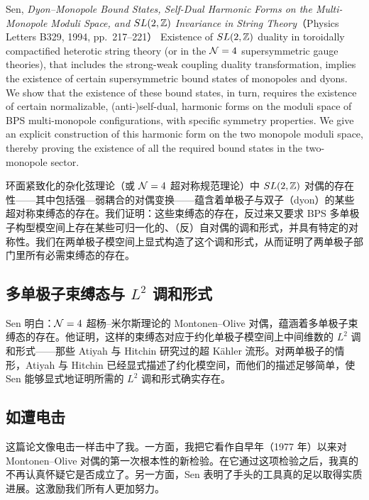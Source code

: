 \begin{abstractbox}{Sen, \emph{Dyon--Monopole Bound States, Self-Dual Harmonic Forms on the Multi-Monopole Moduli Space, and $SL(2,\mathbb{Z})$ Invariance in String Theory}（Physics Letters B329, 1994, pp.~217--221）}
Existence of $SL(2,\mathbb{Z})$ duality in toroidally compactified heterotic string theory (or in the $\mathcal{N}=4$ supersymmetric gauge theories), that includes the strong-weak coupling duality transformation, implies the existence of certain supersymmetric bound states of monopoles and dyons. We show that the existence of these bound states, in turn, requires the existence of certain normalizable, (anti-)self-dual, harmonic forms on the moduli space of BPS multi-monopole configurations, with specific symmetry properties. We give an explicit construction of this harmonic form on the two monopole moduli space, thereby proving the existence of all the required bound states in the two-monopole sector.

\medskip
环面紧致化的杂化弦理论（或 $\mathcal{N}=4$ 超对称规范理论）中 $SL(2,\mathbb{Z})$ 对偶的存在性——其中包括强—弱耦合的对偶变换——蕴含着单极子与双子（dyon）的某些超对称束缚态的存在。我们证明：这些束缚态的存在，反过来又要求 BPS 多单极子构型模空间上存在某些可归一化的、（反）自对偶的调和形式，并具有特定的对称性。我们在两单极子模空间上显式构造了这个调和形式，从而证明了两单极子部门里所有必需束缚态的存在。
\end{abstractbox}

\subsection{多单极子束缚态与 $L^2$ 调和形式}

Sen 明白：$\mathcal{N}=4$ 超杨--米尔斯理论的 Montonen--Olive 对偶，蕴涵着多单极子束缚态的存在。他证明，这样的束缚态对应于约化单极子模空间上中间维数的 $L^2$ 调和形式——那些 Atiyah 与 Hitchin 研究过的超 Kähler 流形。对两单极子的情形，Atiyah 与 Hitchin 已经显式描述了约化模空间，而他们的描述足够简单，使 Sen 能够显式地证明所需的 $L^2$ 调和形式确实存在。

\subsection{如遭电击}

这篇论文像电击一样击中了我。一方面，我把它看作自早年（1977 年）以来对 Montonen--Olive 对偶的第一次根本性的新检验。在它通过这项检验之后，我真的不再认真怀疑它是否成立了。另一方面，Sen 表明了手头的工具真的足以取得实质进展。这激励我们所有人更加努力。

